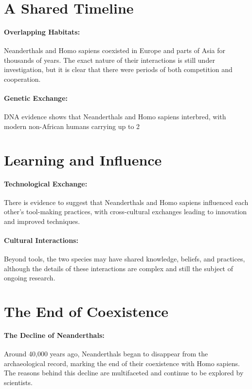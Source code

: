 \documentclass[a4paper,12pt]{book}
\begin{document}
\section*{A Shared Timeline}

\paragraph{Overlapping Habitats:}
Neanderthals and Homo sapiens coexisted in Europe and parts of Asia for thousands of years. The exact nature of their interactions is still under investigation, but it is clear that there were periods of both competition and cooperation.

\paragraph{Genetic Exchange:}
DNA evidence shows that Neanderthals and Homo sapiens interbred, with modern non-African humans carrying up to 2%

\section*{Learning and Influence}

\paragraph{Technological Exchange:}
There is evidence to suggest that Neanderthals and Homo sapiens influenced each other’s tool-making practices, with cross-cultural exchanges leading to innovation and improved techniques.

\paragraph{Cultural Interactions:}
Beyond tools, the two species may have shared knowledge, beliefs, and practices, although the details of these interactions are complex and still the subject of ongoing research.

\section*{The End of Coexistence}

\paragraph{The Decline of Neanderthals:}
Around 40,000 years ago, Neanderthals began to disappear from the archaeological record, marking the end of their coexistence with Homo sapiens. The reasons behind this decline are multifaceted and continue to be explored by scientists.
\end{document}
